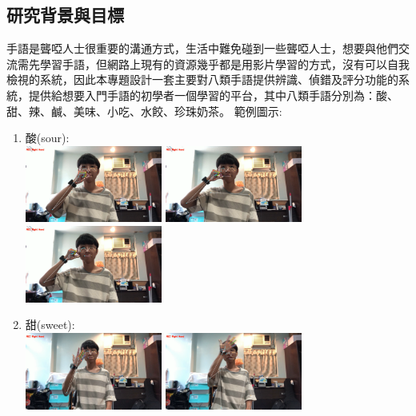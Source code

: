 \documentclass[12pt,a4paper]{report}
\begin{document}
\begin{CJK*}{UTF8}{bkai}
    \section{研究背景與目標}
    \par
    手語是聾啞人士很重要的溝通方式，生活中難免碰到一些聾啞人士，想要與他們交流需先學習手語，但網路上現有的資源幾乎都是用影片學習的方式，沒有可以自我檢視的系統，因此本專題設計一套主要對八類手語提供辨識、偵錯及評分功能的系統，提供給想要入門手語的初學者一個學習的平台，其中八類手語分別為：酸、甜、辣、鹹、美味、小吃、水餃、珍珠奶茶。
    範例圖示:
    \begin{enumerate}
        \item 酸(sour):\\
              \includegraphics[width=45mm]{sour01.png}
              \includegraphics[width=45mm]{sour02.png}
              \includegraphics[width=45mm]{sour03.png}
        \item 甜(sweet):\\
              \includegraphics[width=45mm]{sweet01.png}
              \includegraphics[width=45mm]{sweet02.png}

\end{enumerate}
\end{CJK*}
\end{document}
